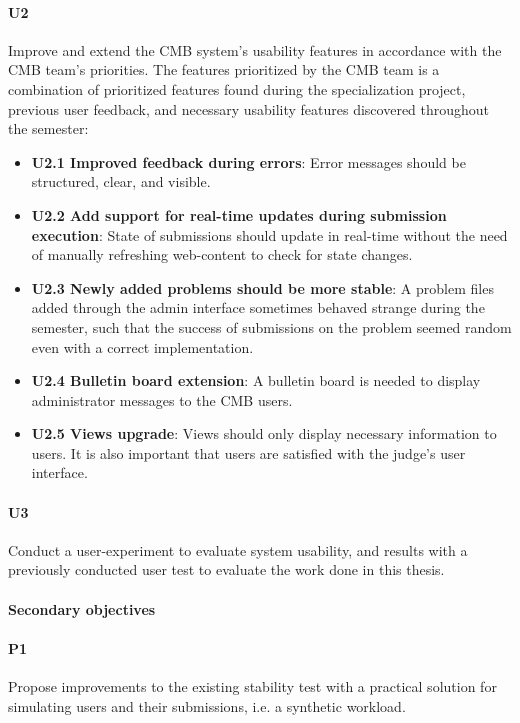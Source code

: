 \paragraph*{U2} Improve and extend the CMB system's usability features in accordance with the CMB team's priorities. The features prioritized by the CMB team is a combination of prioritized features found during the specialization project, previous user feedback, and necessary usability features discovered throughout the semester:
  \begin{itemize}
    \item \textbf{U2.1 Improved feedback during errors}: Error messages should be structured, clear, and visible.
    \item \textbf{U2.2 Add support for real-time updates during submission execution}: State of submissions should update in real-time without the need of manually refreshing web-content to check for state changes.
    \item \textbf{U2.3 Newly added problems should be more stable}: A problem files added through the admin interface sometimes behaved strange during the semester, such that the success of submissions on the problem seemed random even with a correct implementation.
    \item \textbf{U2.4 Bulletin board extension}: A bulletin board is needed to display administrator messages to the CMB users.
    \item \textbf{U2.5 Views upgrade}: Views should only display necessary information to users. It is also important that users are satisfied with the judge's user interface.
  \end{itemize}

\paragraph*{U3} Conduct a user-experiment to evaluate system usability, and results with a previously conducted user test to evaluate the work done in this thesis.

\paragraph*{Secondary objectives} \hfill

\paragraph*{P1} Propose improvements to the existing stability test with a practical solution for simulating users and their submissions, i.e. a synthetic workload.

